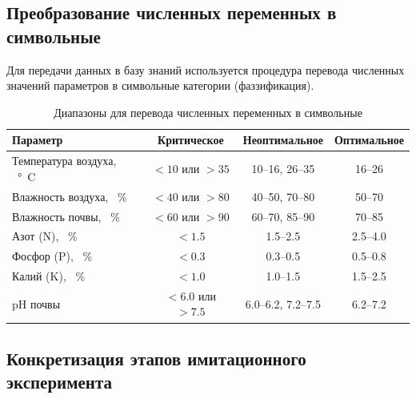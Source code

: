 \subsection{Преобразование численных переменных в символьные}

Для передачи данных в базу знаний используется процедура перевода численных значений параметров в символьные категории (фаззификация).

\begin{table}[H]
\centering
\caption{Диапазоны для перевода численных переменных в символьные}
\label{tab:ranges}
\begin{tabularx}{\textwidth}{|X|c|c|c|}
\hline
\textbf{Параметр} & \textbf{Критическое} & \textbf{Неоптимальное} & \textbf{Оптимальное} \\ \hline
Температура воздуха, \SI{}{\degree C} & $< \num{10}$ или $> \num{35}$ & \num{10}--\num{16}, \num{26}--\num{35} & \num{16}--\num{26} \\ \hline
Влажность воздуха, \SI{}{\percent} & $< \num{40}$ или $> \num{80}$ & \num{40}--\num{50}, \num{70}--\num{80} & \num{50}--\num{70} \\ \hline
Влажность почвы, \SI{}{\percent} & $< \num{60}$ или $> \num{90}$ & \num{60}--\num{70}, \num{85}--\num{90} & \num{70}--\num{85} \\ \hline
Азот (N), \SI{}{\percent} & $< \num{1.5}$ & \num{1.5}--\num{2.5} & \num{2.5}--\num{4.0} \\ \hline
Фосфор (P), \SI{}{\percent} & $< \num{0.3}$ & \num{0.3}--\num{0.5} & \num{0.5}--\num{0.8} \\ \hline
Калий (K), \SI{}{\percent} & $< \num{1.0}$ & \num{1.0}--\num{1.5} & \num{1.5}--\num{2.5} \\ \hline
pH почвы & $< \num{6.0}$ или $> \num{7.5}$ & \num{6.0}--\num{6.2}, \num{7.2}--\num{7.5} & \num{6.2}--\num{7.2} \\ \hline
\end{tabularx}
\end{table}

\subsection{Конкретизация этапов имитационного эксперимента}

